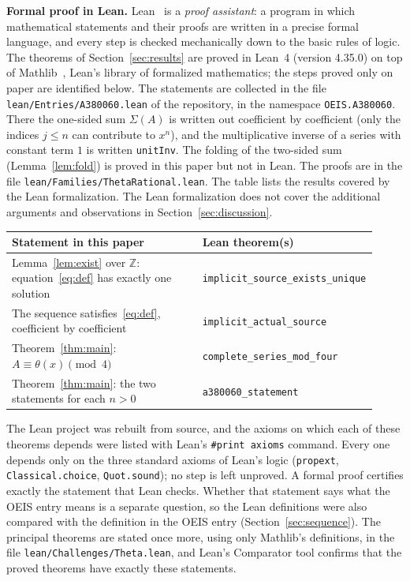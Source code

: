 \documentclass[11pt,a4paper]{article}
\theoremstyle{definition}
\theoremstyle{remark}
\newcommand{\Z}{\mathbb{Z}}
\newcommand{\para}[1]{\par\medskip\noindent\textbf{#1}\enspace}
\begin{document}
\para{Formal proof in Lean.}
Lean~\cite{lean} is a \emph{proof assistant}: a program in which mathematical statements and their proofs are written
in a precise formal language, and every step is checked mechanically down to the basic rules of logic. The theorems of Section~\ref{sec:results} are proved in Lean~4 (version 4.35.0) on top of
Mathlib~\cite{mathlib}, Lean's library of formalized mathematics; the steps proved only on paper are identified below. The statements are collected in the file \texttt{lean/Entries/A380060.lean} of the repository,
in the namespace \texttt{OEIS.A380060}. There the one-sided sum $\Sigma(A)$ is written out coefficient by coefficient (only the indices $j\le n$ can contribute to $x^n$), and the multiplicative inverse of a series with constant term $1$ is written \texttt{unitInv}. The folding of the two-sided sum (Lemma~\ref{lem:fold}) is proved in this paper but not in Lean. The proofs are in the file \texttt{lean/Families/ThetaRational.lean}. 
The table lists the results covered by the Lean formalization. The Lean formalization does not cover the additional arguments and observations in Section~\ref{sec:discussion}.
\begin{center}\small\renewcommand{\arraystretch}{1.25}
\begin{tabular}{>{\raggedright\arraybackslash}p{0.52\linewidth}>{\raggedright\arraybackslash}p{0.4\linewidth}}
\toprule
Statement in this paper & Lean theorem(s)\\
\midrule
Lemma~\ref{lem:exist} over $\Z$: equation~\eqref{eq:def} has exactly one solution & \texttt{implicit\_\allowbreak{}source\_\allowbreak{}exists\_\allowbreak{}unique} \\
The sequence satisfies~\eqref{eq:def}, coefficient by coefficient & \texttt{implicit\_\allowbreak{}actual\_\allowbreak{}source} \\
Theorem~\ref{thm:main}: $A\equiv\theta(x)\pmod4$ & \texttt{complete\_\allowbreak{}series\_\allowbreak{}mod\_\allowbreak{}four} \\
Theorem~\ref{thm:main}: the two statements for each $n>0$ & \texttt{a380060\_\allowbreak{}statement} \\
\bottomrule
\end{tabular}
\end{center}
The Lean project was rebuilt from source, and the axioms on which each of these theorems depends were listed with
Lean's \texttt{\#print axioms} command. Every one depends only on the three standard axioms of Lean's logic
(\texttt{propext}, \texttt{Classical.choice}, \texttt{Quot.sound}); no step is left unproved. A formal proof certifies
exactly the statement that Lean checks. Whether that statement says what the OEIS entry means is a separate question,
so the Lean definitions were also compared with the definition in the OEIS entry
(Section~\ref{sec:sequence}). The principal theorems are stated once more, using only Mathlib's definitions, in the
file \texttt{lean/Challenges/Theta.lean}, and Lean's Comparator tool confirms that the
proved theorems have exactly these statements.
\end{document}
